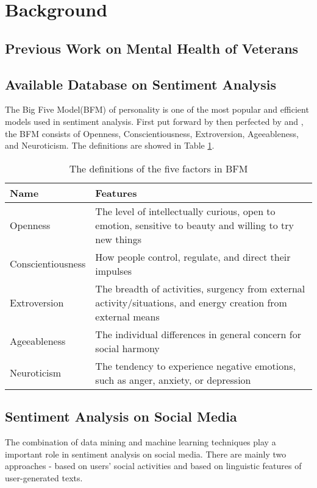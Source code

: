 \section{Background}

\subsection{Previous Work on Mental Health of Veterans}

\subsection{Available Database on Sentiment Analysis}

The Big Five Model(BFM) of personality is one of the most popular and efficient
models used in sentiment analysis. First put forward by \cite{bigFiveModel1}
then perfected by \cite{bigFiveModel2} and \cite{bigFiveModel3}, the BFM
consists of Openness, Conscientiousness, Extroversion, Ageeableness, and
Neuroticism. The definitions are showed in Table \ref{table:definitionBFM}.




\begin{table}[b]
  \caption{The definitions of the five factors in BFM}
  \label{table:definitionBFM}
  \centering
  \renewcommand{\tabularxcolumn}{m} %
  \begin{tabularx}{\textwidth}{l >{\raggedright}X}
    \toprule
    \textbf{Name} & \textbf{Features}
    \tabularnewline \midrule
    Openness & The level of intellectually curious, open to emotion, sensitive to beauty and willing to try new things
    \tabularnewline \hline
    Conscientiousness & How people control, regulate, and direct their impulses
    \tabularnewline \hline
    Extroversion & The breadth of activities, surgency from external activity/situations, and energy creation from external means
    \tabularnewline \hline
    Ageeableness & The individual differences in general concern for social harmony
    \tabularnewline \hline
    Neuroticism & The tendency to experience negative emotions, such as anger, anxiety, or depression
    \tabularnewline \bottomrule
  \end{tabularx}
\end{table}

\subsection{Sentiment Analysis on Social Media}

The combination of data mining and machine learning techniques play a important
role in sentiment analysis on social media. There are mainly two approaches -
based on users' social activities and based on linguistic features of
user-generated texts.
